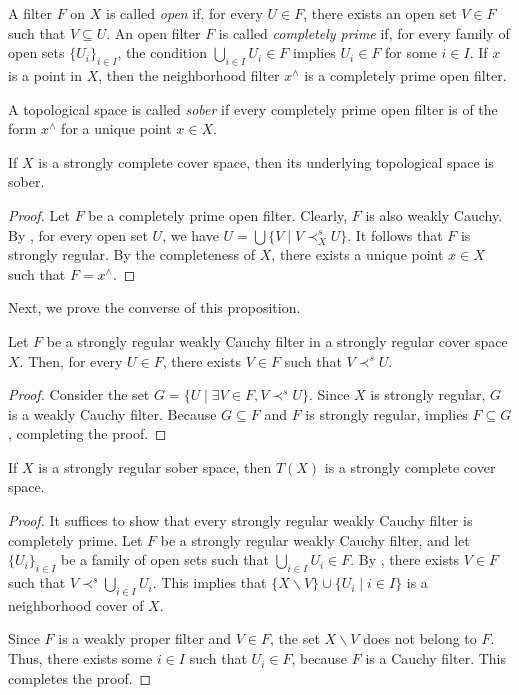 \documentclass[reqno]{amsart}
\theoremstyle{definition}
\theoremstyle{remark}
\numberwithin{figure}{section}
\newcommand{\rb}{\prec}
\begin{document}
A filter $F$ on $X$ is called \emph{open} if, for every $U \in F$, there exists an open set $V \in F$ such that $V \subseteq U$.
An open filter $F$ is called \emph{completely prime} if, for every family of open sets $\{ U_i \}_{i \in I}$, the condition $\bigcup_{i \in I} U_i \in F$ implies $U_i \in F$ for some $i \in I$.
If $x$ is a point in $X$, then the neighborhood filter $x^\wedge$ is a completely prime open filter.

A topological space is called \emph{sober} if every completely prime open filter is of the form $x^\wedge$ for a unique point $x \in X$.

\begin{prop}[u-sober]
If $X$ is a strongly complete cover space, then its underlying topological space is sober.
\end{prop}
\begin{proof}
Let $F$ be a completely prime open filter.
Clearly, $F$ is also weakly Cauchy.  
By , for every open set $U$, we have $U = \bigcup \{ V \mid V \rb^s_X U \}$.
It follows that $F$ is strongly regular.  
By the completeness of $X$, there exists a unique point $x \in X$ such that $F = x^\wedge$.
\end{proof}

Next, we prove the converse of this proposition.

\begin{lem}
Let $F$ be a strongly regular weakly Cauchy filter in a strongly regular cover space $X$.
Then, for every $U \in F$, there exists $V \in F$ such that $V \rb^s U$.
\end{lem}
\begin{proof}
Consider the set $G = \{ U \mid \exists V \in F, V \rb^s U \}$.
Since $X$ is strongly regular, $G$ is a weakly Cauchy filter.
Because $G \subseteq F$ and $F$ is strongly regular,  implies $F \subseteq G$, completing the proof.
\end{proof}

\begin{prop}[t-complete]
If $X$ is a strongly regular sober space, then $T(X)$ is a strongly complete cover space.
\end{prop}
\begin{proof}
It suffices to show that every strongly regular weakly Cauchy filter is completely prime.
Let $F$ be a strongly regular weakly Cauchy filter, and let $\{ U_i \}_{i \in I}$ be a family of open sets such that $\bigcup_{i \in I} U_i \in F$.  
By , there exists $V \in F$ such that $V \rb^s \bigcup_{i \in I} U_i$.  
This implies that $\{ X \backslash V \} \cup \{ U_i \mid i \in I \}$ is a neighborhood cover of $X$.

Since $F$ is a weakly proper filter and $V \in F$, the set $X \backslash V$ does not belong to $F$.
Thus, there exists some $i \in I$ such that $U_i \in F$, because $F$ is a Cauchy filter.  
This completes the proof.
\end{proof}
\end{document}
